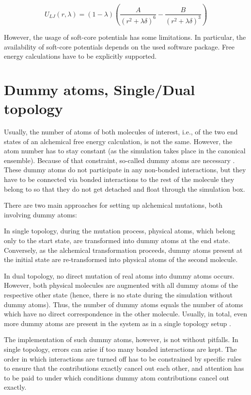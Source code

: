 \[
U_{LJ}\left(r,\lambda\right)=\left(1-\lambda\right)\left(\frac{A}{\left(r^{2}+\lambda\delta\right)^{6}}-\frac{B}{\left(r^{2}+\lambda\delta\right)^{3}}\right)
\]

However, the usage of soft-core potentials has some limitations. In
particular, the availability of soft-core potentials depends on the
used software package. Free energy calculations have to be explicitly
supported. 

\section{Dummy atoms, Single/Dual topology}

Usually, the number of atoms of both molecules of interest, i.e., of the
two end states of an alchemical free energy calculation, is not
the same. However, the atom number has to stay constant (as the simulation
takes place in the canonical ensemble). Because of that constraint,
so-called dummy atoms are necessary \cite{Fleck.2021}. These dummy
atoms do not participate in any non-bonded interactions, but they
have to be connected via bonded interactions to the rest of the molecule
they belong to so that they do not get detached and float through
the simulation box.

There are two main approaches for setting up alchemical mutations, both involving dummy atoms: 

In single topology, during the mutation process, physical atoms, which belong only to the start state, are
transformed into dummy atoms at the end state. Conversely, 
as the alchemical transformation proceeds, dummy atoms present at the initial state are re-transformed
into physical atoms of the second molecule.

In dual topology, no direct mutation of real atoms into dummy atoms
occurs. However, both physical molecules are augmented with all dummy
atoms of the respective other state (hence, there is no state during the simulation
without dummy atoms). Thus, the number of dummy atoms equals the number
of atoms which have no direct correspondence in the other molecule.
Usually, in total, even more dummy atoms are present in the system
as in a single topology setup \cite{Fleck.2021}.

The implementation of such dummy atoms, however, is not without pitfalls.
In single topology, errors can arise if too many bonded interactions are kept. The order in which interactions are turned off has to be constrained
by specific rules to ensure that the contributions exactly cancel
out each other, and attention has to be paid to under which conditions
dummy atom contributions cancel out exactly. \cite{Fleck.2021}

